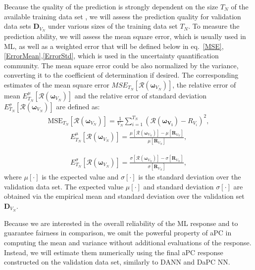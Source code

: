 \documentclass[a4paper,fleqn]{article}
\newcommand{\rw}[1]{\textcolor{blue}{#1}}
\renewcommand{\rw}[1]{#1}
\begin{document}
Because the quality of the prediction is strongly dependent on the size $T_N$ of the available training data set \cite{OladNowak_RESS2012, hornik1989universal}, we will assess the prediction quality for validation data sets $\bm{D}_{V_N}$ under various sizes of the training data set $T_N$. To measure the prediction ability, we will assess the mean square error, which is usually used in ML, as well as a weighted error \rw{that will be defined below in eq.~\eqref{MSE},\eqref{ErrorMean},\eqref{ErrorStd}}, which is used in the uncertainty quantification community.  The mean square error could be also normalized by the variance, converting it to the coefficient of determination if desired. The corresponding estimates of the mean square error $MSE_{T_N}\left[\mathcal{R}(\bm{\omega}_{V_N})\right]$, the relative error of mean $E^\mu_{T_N}\left[\mathcal{R}(\bm{\omega}_{V_N})\right]$ and the relative error of standard deviation $E^\sigma_{T_N}\left[\mathcal{R}(\bm{\omega}_{V_N})\right]$ are defined as:
%
\begin{eqnarray}
\label{MSE}
	 \text{MSE}_{T_N}\left[\mathcal{R}(\bm{\omega}_{V_N})\right] = \frac{1}{V_N}\sum_{i=1}^{T_N} \left( \mathcal{R}(\bm{\omega_{V_i}})-R_{V_i} \right)^2,
\end{eqnarray}
%
%
\begin{eqnarray}
\label{ErrorMean}
E^\mu_{T_N}\left[\mathcal{R}(\bm{\omega}_{V_N})\right]= \frac{\mu\left[\mathcal{R}(\bm{\omega}_{V_N})\right]-\mu\left[\mathbf{R}_{V_N}\right]}{\mu\left[\mathbf{R}_{V_N}\right]}, 
\end{eqnarray}
%

%
\begin{eqnarray}
\label{ErrorStd}
E^\sigma_{T_N}\left[\mathcal{R}(\bm{\omega}_{V_N})\right] = \frac{\sigma\left[\mathcal{R}(\bm{\omega}_{V_N})\right]-\sigma\left[\mathbf{R}_{V_N}\right]}{\sigma\left[\mathbf{R}_{V_N}\right]}, 
\end{eqnarray}
%
where $\mu\left[\cdot\right]$ is the expected value and $\sigma\left[\cdot\right]$ is the standard deviation over the validation data set. The expected value $\mu[\cdot]$ and standard deviation $\sigma[\cdot]$ are obtained via 
the empirical mean and standard deviation over the validation set $\bm{D}_{V_N}$.

Because we are interested in the overall reliability of the ML response and to guarantee fairness in comparison, we omit the powerful property of aPC in computing the mean and variance without additional evaluations of the response. Instead, we will estimate them numerically using the final aPC response constructed on the validation data set, similarly to DANN and DaPC NN. 
\end{document}

